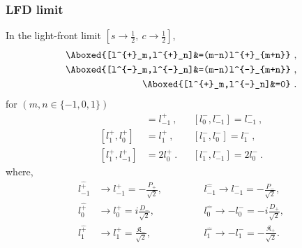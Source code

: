 \documentclass[]{article}
\numberwithin{equation}{section}
\begin{document}
{{\subsubsection{LFD limit}
In the light-front limit $[s\longrightarrow\frac{1}{2},~c\longrightarrow\frac{1}{2}]$,
\begin{align}
    \Aboxed{[l^{+}_m,l^{+}_n]&=(m-n)l^{+}_{m+n}}~,\\
    \Aboxed{[l^{-}_m,l^{-}_n]&=(m-n)l^{-}_{m+n}}~,\\
    \Aboxed{[l^{+}_m,l^{-}_n]&=0}~.
\end{align}
for $(m,n\in\{-1,0,1\})$
\begin{align}
     [l^{+}_0,l^{+}_{-1}]&=l^{+}_{-1}~,&&[l^{-}_0,l^{-}_{-1}]=l^{-}_{-1}~,\\
     [l^{+}_1,l^{+}_{0}]&=l^{+}_{1}~,&&[l^{-}_1,l^{-}_{0}]=l^{-}_{1}~,\\
     [l^{+}_1,l^{+}_{-1}]&=2l^{+}_{0}~.&&[l^{-}_1,l^{-}_{-1}]=2l^{-}_{0}~.
 \end{align}
 where,
\begin{align}
    l^{\hat{+}}_{-1}&\longrightarrow l^{+}_{-1}=-\frac{P_{+}}{\sqrt{2}},~~~~~~~~~~~~&&l^{\hat{-}}_{-1}\longrightarrow l^{-}_{-1}= -\frac{P_{-}}{\sqrt{2}},\\
    l^{\hat{+}}_{0}&\longrightarrow l^{+}_{0}=i\frac{D_{-}}{\sqrt{2}},~~~~~~~~~~~~&&l^{\hat{-}}_{0}\longrightarrow -l^{-}_{0}= -i\frac{D_{+}}{\sqrt{2}},\\
    l^{\hat{+}}_{1}&\longrightarrow l^{+}_{1}= \frac{\mathfrak{K}_{-}}{\sqrt{2}},~~~~~~~~~~~~&&l^{\hat{-}}_{1}\longrightarrow -l^{-}_{1}= -\frac{\mathfrak{K}_{+}}{\sqrt{2}}.
\end{align}
\begin{table}[h!]
\centering
\caption{\label{tabelinterpolationlfd}$1+1$ conformal algebra in LFD}
\end{table}

}}
\end{document}
